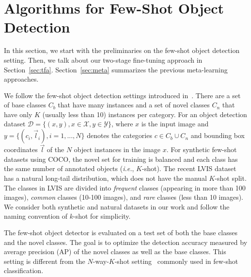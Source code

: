 \vspace{-0.3cm}
\section{Algorithms for Few-Shot Object Detection}

In this section, we start with the preliminaries on the few-shot object detection setting. Then, we talk about our two-stage fine-tuning approach in
Section~\ref{sec:tfa}. Section~\ref{sec:meta} summarizes the previous meta-learning approaches.

We follow the few-shot object detection settings introduced in~\citet{kang2019few}. There are a set of base
classes $C_b$ that have many instances and a set of novel classes $C_n$ that
have only $K$ (usually less than 10) instances per category.
For an object detection dataset $\mathcal{D}=\{(x, y), x\in\mathcal{X}, y\in\mathcal{Y}\}$, where $x$
is the input image and $y=\{(c_i, \vec{l}_i), i=1, ...,N\}$ denotes the categories $c \in C_b \cup C_n$
and bounding box coordinates $\vec{l}$ of the $N$ object instances in the image $x$.
For synthetic few-shot datasets using
COCO, the novel set for training is balanced and each class has the same number of 
annotated objects (\textit{i.e.}, $K$-shot). The recent LVIS dataset has a natural long-tail distribution, which does
not have the manual $K$-shot split. The classes in LVIS are divided into \emph{frequent} classes
(appearing in more than 100 images), \emph{common} classes (10-100 images), and \emph{rare}
classes (less than 10 images). We consider both synthetic and natural datasets in our work and
follow the naming convention of $k$-shot for simplicity. 

The few-shot object detector is evaluated on a test set of both the base classes and
the novel classes. The goal is to optimize the detection accuracy measured by average precision (AP)
of the novel classes as well as the base classes. This setting is different from the $N$-way-$K$-shot setting~\cite{finn2017model,vinyals2016matching,snell2017prototypical}
commonly used in few-shot classification. 

